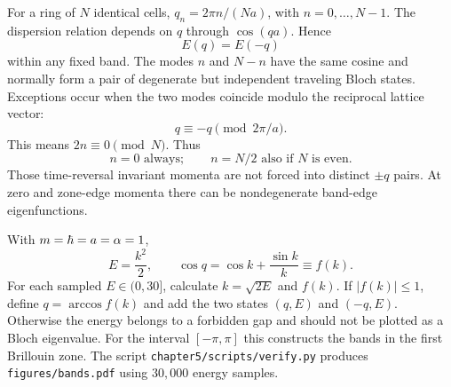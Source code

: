 For a ring of $N$ identical cells,
$q_n=2\pi n/(Na)$, with
$n=0,\ldots,N-1$.
The dispersion relation depends
on $q$ through $\cos(qa)$.
Hence
\begin{equation}
E(q)=E(-q)
\end{equation}
within any fixed band.
The modes $n$ and $N-n$ have the
same cosine and normally form a pair
of degenerate but independent traveling
Bloch states. Exceptions occur when
the two modes coincide modulo the
reciprocal lattice vector:
\begin{equation}
q\equiv-q\pmod{2\pi/a}.
\end{equation}
This means $2n\equiv0\pmod N$.
Thus
\begin{equation}
\boxed{n=0\text{ always};\qquad
n=N/2\text{ also if }N\text{ is even}}.
\end{equation}
Those time-reversal invariant momenta
are not forced into distinct $\pm q$
pairs. At zero and zone-edge
momenta there can be nondegenerate
band-edge eigenfunctions.

With $m=\hbar=a=\alpha=1$,
\begin{equation}
E=\frac{k^2}{2},\qquad
\cos q=\cos k+\frac{\sin k}{k}\equiv f(k).
\end{equation}
For each sampled $E\in(0,30]$,
calculate $k=\sqrt{2E}$ and $f(k)$.
If $|f(k)|\le1$, define
$q=\arccos f(k)$ and add the two
states $(q,E)$ and $(-q,E)$.
Otherwise the energy belongs to a
forbidden gap and should not be
plotted as a Bloch eigenvalue.
For the interval $[-\pi,\pi]$ this
constructs the bands in the first
Brillouin zone. The script
\texttt{chapter5/scripts/verify.py}
produces \texttt{figures/bands.pdf}
using $30{,}000$ energy samples.
